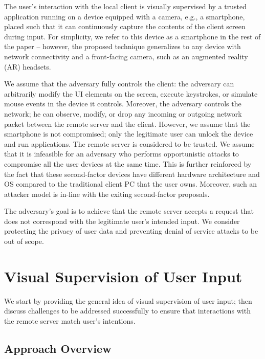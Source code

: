\documentclass[sigconf, anonymous, balance=false]{acmart}
\newcommand{\myparagraph}[1]{\myparagraphnodot{#1.}}
\newcommand{\myparagraphnodot}[1]{\vspace{4pt} \noindent {\bfseries #1}\xspace}
\begin{document}
The user's interaction with the local client is visually supervised by a trusted application running on a device equipped with a camera, e.g., a smartphone, placed such that it can continuously capture the contents of the client screen during input.
For simplicity, we refer to this device as a smartphone in the rest of the paper -- however, the proposed technique generalizes to any device with network connectivity and a front-facing camera, such as an augmented reality (AR) headsets. %


\myparagraph{Adversary model}
We assume that the adversary fully controls the client: the adversary can arbitrarily modify the UI elements on the screen, execute keystrokes, or simulate mouse events in the device it controls. Moreover, the adversary controls the network; he can observe, modify, or drop any incoming or outgoing network packet between the remote server and the client.
However, we assume that the smartphone is not compromised; only the legitimate user can unlock the device and run applications. The remote server is considered to be trusted. %
We assume that it is infeasible for an adversary who performs opportunistic attacks to compromise all the user devices at the same time. This is further reinforced by the fact that these second-factor devices have different hardware architecture and OS compared to the traditional client PC that the user owns.
Moreover, such an attacker model is in-line with the exiting second-factor proposals.


The adversary's goal is to achieve that the remote server accepts a request that does not correspond with the legitimate user's intended input.
We consider protecting the privacy of user data and preventing denial of service attacks to be out of scope.


\section{Visual Supervision of User Input}
\label{sec:systemDesign}

We start by providing the general idea of visual supervision of user input; then discuss challenges to be addressed successfully to ensure that interactions with the remote server match user's intentions.


\subsection{Approach Overview}
\label{sec:systemDesign:overallApproach}
\end{document}
